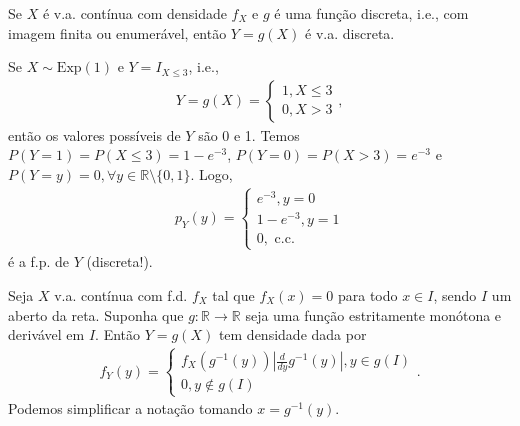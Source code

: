 \documentclass[../Notas.tex]{subfiles}
\begin{document}
\begin{remark}
Se $X$ é v.a. contínua com densidade $f_X$ e $g$ é uma função discreta, i.e., com imagem finita ou enumerável, então $Y=g(X)$ é v.a. discreta.
\end{remark}

\begin{example}
Se $X\sim\text{Exp}(1)$ e $Y = I_{X\leq 3}$, i.e.,
\begin{align*}
    Y = g(X) = \begin{cases}
    1, X\leq 3 \\
    0, X > 3
    \end{cases},
\end{align*}
então os valores possíveis de $Y$ são 0 e 1. Temos $P(Y=1) = P(X\leq 3) = 1 - e^{-3}$, $P(Y=0) = P(X>3) = e^{-3}$ e $P(Y=y) = 0, \forall y\in\mathbb{R}\setminus\{0,1\}$. Logo,
\begin{align*}
    p_Y(y) = \begin{cases}
    e^{-3}, y = 0 \\
    1 - e^{-3}, y = 1 \\
    0, \text{ c.c.}
    \end{cases}
\end{align*}
é a f.p. de $Y$ (discreta!).
\end{example}

\begin{theorem}
Seja $X$ v.a. contínua com f.d. $f_X$ tal que $f_X(x) = 0$ para todo $x\in I$, sendo $I$ um aberto da reta. Suponha que $g:\mathbb{R}\to\mathbb{R}$ seja uma função estritamente monótona e derivável em $I$. Então $Y=g(X)$ tem densidade dada por
\begin{align*}
    f_Y(y) = \begin{cases}
    f_X(g^{-1}(y))\left| \frac{d}{dy}g^{-1}(y) \right|, y\in g(I) \\
    0, y\notin g(I)
    \end{cases}.
\end{align*}
Podemos simplificar a notação tomando $x = g^{-1}(y)$.
\end{theorem}
\end{document}

